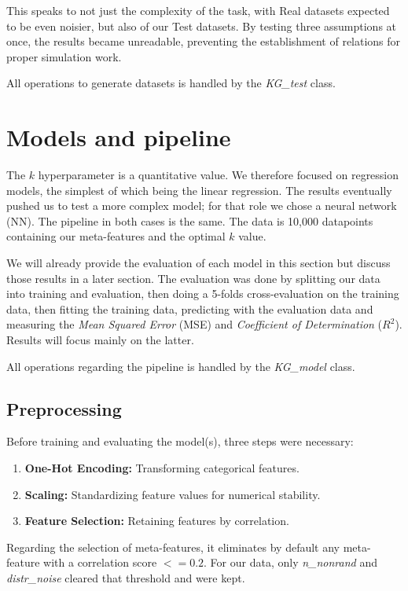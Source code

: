 \documentclass[a4paper,11pt]{article}
\begin{document}
This speaks to not just the complexity of the task, with Real datasets expected to be even noisier, but also of our Test datasets. By testing three assumptions at once, the results became unreadable, preventing the establishment of relations for proper simulation work.

All operations to generate datasets is handled by the \textit{KG\_test} class.

\section{Models and pipeline}

The \(k\) hyperparameter is a quantitative value. We therefore focused on regression models, the simplest of which being the linear regression. The results eventually pushed us to test a more complex model; for that role we chose a neural network (NN). The pipeline in both cases is the same. The data is 10,000 datapoints containing our meta-features and the optimal \(k\) value.

We will already provide the evaluation of each model in this section but discuss those results in a later section. The evaluation was done by splitting our data into training and evaluation, then doing a 5-folds cross-evaluation on the training data, then fitting the training data, predicting with the evaluation data and measuring the \textit{Mean Squared Error} (MSE) and \textit{Coefficient of Determination} (\(R^2\)). Results will focus mainly on the latter.

All operations regarding the pipeline is handled by the \textit{KG\_model} class.

\subsection{Preprocessing}
Before training and evaluating the model(s), three steps were necessary:
\begin{enumerate}
    \item \textbf{One-Hot Encoding:} Transforming categorical features.
    \item \textbf{Scaling:} Standardizing feature values for numerical stability.
    \item \textbf{Feature Selection:} Retaining features by correlation.
\end{enumerate}
Regarding the selection of meta-features, it eliminates by default any meta-feature with a correlation score \(<= 0.2\). For our data, only \textit{n\_nonrand} and \textit{distr\_noise} cleared that threshold and were kept. 
\end{document}
